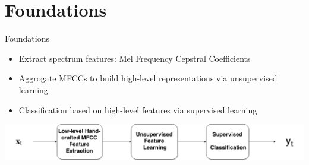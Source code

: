 \section{Foundations} %
	\begin{frame}[t]{Foundations}
% 
% 	
% 	
% 
	
	      \begin{itemize}
	       \item Extract spectrum features: Mel Frequency Cepstral Coefficients
	       \item Aggrogate MFCCs to build high-level representations via unsupervised learning
	       \item Classification based on high-level features via supervised learning
	      \end{itemize}
	      \vspace{10mm}
	      \includegraphics[width=\linewidth]{Framework.png}


\end{frame}
